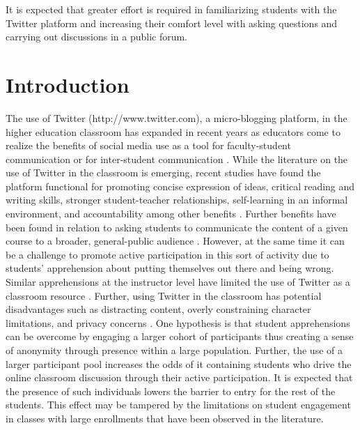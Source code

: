 \documentclass[12pt]{article}
\begin{document}
It is expected that greater effort is required in familiarizing students with the Twitter platform and increasing their comfort level with asking questions and carrying out discussions in a public forum.



\section*{Introduction}

The use of Twitter (http://www.twitter.com), a micro-blogging platform, in the higher education classroom has expanded in recent years as educators come to realize the benefits of social media use as a tool for faculty-student communication or for inter-student communication \cite{blessing_using_2012}. While the literature on the use of Twitter in the classroom is emerging, recent studies have found the platform functional for promoting concise expression of ideas, critical reading and writing skills, stronger student-teacher relationships, self-learning in an informal environment, and accountability among other benefits \cite{shiffman_twitter_2012}. Further benefits have been found in relation to asking students to communicate the content of a given course to a broader, general-public audience \cite{junco_effect_2011, ha_influence_2013}. However, at the same time it can be a challenge to promote active participation in this sort of activity due to students’ apprehension about putting themselves out there and being wrong. Similar apprehensions at the instructor level have limited the use of Twitter as a classroom resource \cite{carpenter_how_2014}. Further, using Twitter in the classroom has potential disadvantages such as distracting content, overly constraining character limitations, and privacy concerns \cite{dhir_tweeters_2013}. One hypothesis is that student apprehensions can be overcome by engaging a larger cohort of participants thus creating a sense of anonymity through presence within a large population. Further, the use of a larger participant pool increases the odds of it containing students who drive the online classroom discussion through their active participation. It is expected that the presence of such individuals lowers the barrier to entry for the rest of the students. This effect may be tampered by the limitations on student engagement in classes with large enrollments that have been observed in the literature. \cite{ahlfeldt_measurement_2005}
\end{document}
